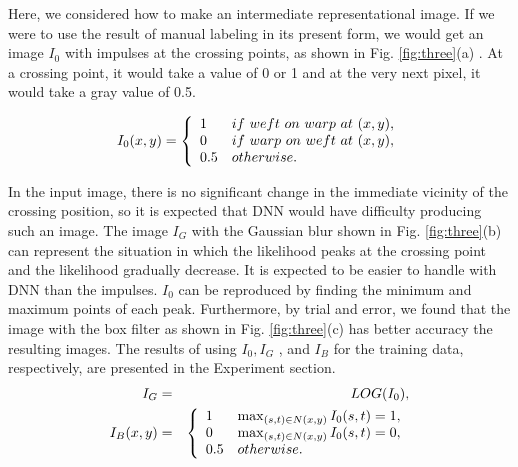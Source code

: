 Here, we considered how to make an intermediate representational image. If we were to use the result of manual labeling in its present form, we would get an image $I_0$ with impulses at the crossing points, as shown in Fig. \ref{fig:three}(a) . At a crossing point, it would take a value of 0 or 1 and at the very next pixel, it would take a gray value of 0.5.

\begin{eqnarray}
  I_0(x,y) = 
  \left\{ \begin{array}{l l}
    1 & if \ weft \ on \ warp \ at \ (x,y), \\ 
    0 & if \ warp \ on \ weft \ at \ (x,y), \\ 
    0.5 & otherwise.  
  \end{array} \right.
\label{eqnarray:1}
\end{eqnarray}

In the input image, there is no significant change in the immediate vicinity of the crossing position, so it is expected that DNN would have difficulty producing such an image. The image $I_G$ with the Gaussian blur shown in Fig. \ref{fig:three}(b) can represent the situation in which the likelihood peaks at the crossing point and the likelihood gradually decrease. It is expected to be easier to handle with DNN than the impulses. $I_0$ can be reproduced by finding the minimum and maximum points of each peak. Furthermore, by trial and error, we found that the image with the box filter as shown in Fig. \ref{fig:three}(c) has better accuracy   the resulting images. The results of using $I_0, I_G$ , and $I_B$  for the training data, respectively, are presented in the Experiment section.
\begin{eqnarray}
  I_G &=& LOG(I_0), \\ 
  I_B(x,y) &=& \left\{ \begin{array}{l l}
    1 & \max_{(s,t) \in N(x,y)} I_0(s,t)=1, \\ 
    0 & \max_{(s,t) \in N(x,y)} I_0(s,t)=0, \\ 
    0.5 & otherwise.  
  \end{array} \right.
\end{eqnarray}

